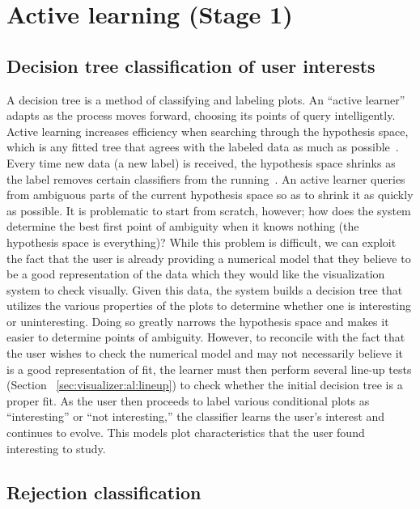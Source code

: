 \section{Active learning (Stage 1)}
\label{sec:visualizer:al}

\subsection{Decision tree classification of user interests}
\label{sec:visualizer:al:tree}

A decision tree is a method of classifying and labeling plots. An ``active learner'' adapts as the process moves forward, choosing its points of query intelligently. Active learning increases efficiency when searching through the hypothesis space, which is any fitted tree that agrees with the labeled data as much as possible~\cite{dasgupta2011}. Every time new data (a new label) is received, the hypothesis space shrinks as the label removes certain classifiers from the running~\cite{dasgupta2011}. An active learner queries from ambiguous parts of the current hypothesis space so as to shrink it as quickly as possible. It is problematic to start from scratch, however; how does the system determine the best first point of ambiguity when it knows nothing (the hypothesis space is everything)? While this problem is difficult, we can exploit the fact that the user is already providing a numerical model that they believe to be a good representation of the data which they would like the visualization system to check visually. Given this data, the system builds a decision tree that utilizes the various properties of the plots to determine whether one is interesting or uninteresting. Doing so greatly narrows the hypothesis space and makes it easier to determine points of ambiguity. However, to reconcile with the fact that the user wishes to check the numerical model and may not necessarily believe it is a good representation of fit, the learner must then perform several line-up tests (Section ~\ref{sec:visualizer:al:lineup}) to check whether the initial decision tree is a proper fit. As the user then proceeds to label various conditional plots as ``interesting'' or ``not interesting,'' the classifier learns the user’s interest and continues to evolve. This models plot characteristics that the user found interesting to study.

\subsection{Rejection classification}
\label{sec:visualizer:al:rejection}

